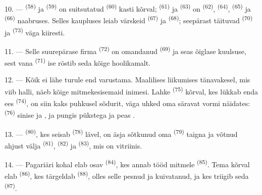 10. ---  \textsuperscript{(58)} ja  \textsuperscript{(59)} on
suitsutatud  \textsuperscript{(60)} kasti kõrval; 
\textsuperscript{(61)} ja  \textsuperscript{(63)} on 
\textsuperscript{(62)},  \textsuperscript{(64)},  \textsuperscript{(65)} ja  \textsuperscript{(66)}
naabruses. Selles kaupluses leiab värskeid  \textsuperscript{(67)} ja
 \textsuperscript{(68)}; seepärast täituvad 
\textsuperscript{(70)} ja  \textsuperscript{(73)} väga kiiresti.

11. --- Selle suurepärase firma  \textsuperscript{(72)} on omandanud
 \textsuperscript{(69)} ja  seas õiglase kuulsuse, sest
vana  \textsuperscript{(71)} ise röstib seda kõige hoolikamalt.

\VUsaut{4.0mm}
\VUsaut{3.0mm}

12. --- Kõik ei lähe turule end varustama. Maalilises liikumises tänavakesel, mis viib
halli, näeb kõige mitmekesisemaid inimesi. Lahke 
\textsuperscript{(75)} kõrval, kes lükkab enda ees  \textsuperscript{(74)},
on siin kaks puhkusel sõdurit, väga uhked oma säravat vormi näidates:
 \textsuperscript{(76)} sinise  ja , ja  pungis pükstega ja peas .

13. ---  \textsuperscript{(80)}, kes seisab 
\textsuperscript{(78)} lävel, on äsja sõtkunud oma  \textsuperscript{(79)}
taigna ja võtnud ahjust välja  \textsuperscript{(81)},
 \textsuperscript{(82)} ja  \textsuperscript{(83)},
mis on vitriinis.

14. --- Pagariäri kohal elab osav  \textsuperscript{(84)}, kes annab
tööd mitmele  \textsuperscript{(85)}. Tema kõrval elab
 \textsuperscript{(86)}, kes tärgeldab 
\textsuperscript{(88)}, olles selle pesnud ja kuivatanud, ja kes triigib seda
 \textsuperscript{(87)}.

\VUsaut{4.0mm}
\VUsaut{3.0mm}

